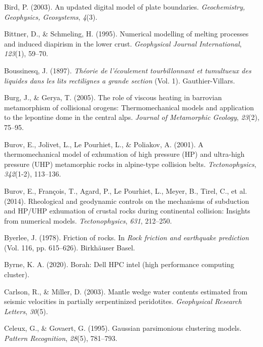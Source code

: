 \begin{CSLReferences}{1}{1}
\leavevmode{}%
Bird, P. (2003). An updated digital model of plate boundaries. \emph{Geochemistry, Geophysics, Geosystems}, \emph{4}(3).

\leavevmode{}%
Bittner, D., \& Schmeling, H. (1995). Numerical modelling of melting processes and induced diapirism in the lower crust. \emph{Geophysical Journal International}, \emph{123}(1), 59--70.

\leavevmode{}%
Boussinesq, J. (1897). \emph{Th{é}orie de l'{é}coulement tourbillonnant et tumultueux des liquides dans les lits rectilignes a grande section} (Vol. 1). Gauthier-Villars.

\leavevmode{}%
Burg, J., \& Gerya, T. (2005). The role of viscous heating in barrovian metamorphism of collisional orogens: Thermomechanical models and application to the lepontine dome in the central alps. \emph{Journal of Metamorphic Geology}, \emph{23}(2), 75--95.

\leavevmode{}%
Burov, E., Jolivet, L., Le Pourhiet, L., \& Poliakov, A. (2001). A thermomechanical model of exhumation of high pressure (HP) and ultra-high pressure (UHP) metamorphic rocks in alpine-type collision belts. \emph{Tectonophysics}, \emph{342}(1-2), 113--136.

\leavevmode{}%
Burov, E., François, T., Agard, P., Le Pourhiet, L., Meyer, B., Tirel, C., et al. (2014). Rheological and geodynamic controls on the mechanisms of subduction and HP/UHP exhumation of crustal rocks during continental collision: Insights from numerical models. \emph{Tectonophysics}, \emph{631}, 212--250.

\leavevmode{}%
Byerlee, J. (1978). Friction of rocks. In \emph{Rock friction and earthquake prediction} (Vol. 116, pp. 615--626). Birkh{ä}user Basel.

\leavevmode{}%
Byrne, K. A. (2020). Borah: Dell HPC intel (high performance computing cluster).

\leavevmode{}%
Carlson, R., \& Miller, D. (2003). Mantle wedge water contents estimated from seismic velocities in partially serpentinized peridotites. \emph{Geophysical Research Letters}, \emph{30}(5).

\leavevmode{}%
Celeux, G., \& Govaert, G. (1995). Gaussian parsimonious clustering models. \emph{Pattern Recognition}, \emph{28}(5), 781--793.


\end{CSLReferences}

